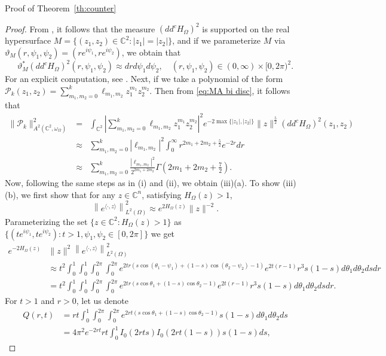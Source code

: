 \documentclass[11pt, oneside, reqno]{amsart}
\numberwithin{equation}{section}
\theoremstyle{definition}
\newcommand{\be} {\begin{equation}}
\newcommand{\ee} {\end{equation}}
\newcommand{\bea} {\begin{eqnarray}}
\newcommand{\eea} {\end{eqnarray}}
\newcommand{\C}{\mathbb C}
\newcommand{\ltt}{\left(}
\newcommand{\rtt}{\right)}
\newcommand{\Om}{\Omega}
\begin{document}
{\begin{section}{Proof of Theorem~\ref{th:counter}}
\begin{proof}
From \cite[Theorem 1]{BS08}, it follows that the measure $(dd^c H_\Om)^2$ is supported on the real hypersurface $M=\{(z_1,z_2)\in\C^2:|z_1|=|z_2|\}$, and if we parameterize $M$ via $\vartheta_M
         \ltt r,\psi_1,\psi_2\rtt=\ltt re^{i\psi_1},re^{i\psi_2}\rtt$, we obtain that
        \be\label{eq:MA bi disc}
       \vartheta_M^* (dd^cH_\Om)^2\ltt r,\psi_1,\psi_2\rtt\approx dr d\psi_1 d\psi_2,\quad (r,\psi_1,\psi_2)\in(0,\infty)\times[0,2\pi)^2.
        \ee
        For an explicit computation, see \cite[Section~6.2(iv)]{AC24}. 
Next, if we take a polynomial of the form $\mathcal P_k(z_1,z_2)=\sum\limits_{m_1,m_2=0}^k\ell_{m_1,m_2}z_1^{m_1} z_2^{m_2}$. Then from \eqref{eq:MA bi disc}, it follows that
 \bea\nonumber
       \|\mathcal P_k\|_{A^2(\C^2,\omega_\Om)}^2&=&\int_{\C^2}\left|{\sum\limits_{m_1,m_2=0}^k \ell_{m_1,m_2}} z_1^{m_1}z_2^{m_2}\right|^2 e^{-2\max\{|z_1|,|z_2|\}}\|z\|^{\frac{5}{2}}(dd^cH_\Om)^2(z_1,z_2)\\
       \nonumber
       &\approx&  \sum\limits_{m_1,m_2=0}^k |\ell_{m_1,m_2}|^2\int_0^\infty r^{2m_1+2m_2+\frac{5}{2}}e^{-2r} dr\\
      \nonumber &\approx& \sum\limits_{m_1,m_2=0}^k \frac{|\ell_{m_1,m_2}|^2}{2^{2m_1+2m_2}}\Gamma\ltt 2m_1+2m_2+\frac{7}{2}\rtt.
       \eea
Now, following the same steps as in (i) and (ii), we obtain (iii)(a).
{
To show (iii)(b), we first show that
for any $z\in\C^n$, satisfying $H_\Om(z)>1$,
\[
\left\|e^{\langle\cdot, z\rangle}\right\|^2_{L^2(\Om)}\approx {e^{2H_\Om(z)}}\|z\|^{-2}.
\]
Parameterizing the set $\{z\in\C^2: H_\Om(z)>1\}$ as $\{(te^{i\psi_1},te^{i\psi_2}): t>1, \psi_1,\psi_2\in[0,2\pi]\}$ we get
\begin{align}\label{eq:main est counter}
\nonumber e^{-2H_\Om(z)}&\|z\|^2\left\|e^{\langle\cdot, z\rangle}\right\|^2_{L^2(\Om)}\\ 
\nonumber&\approx t^2\int_0^1\int_0^1\int_0^{2\pi}\int_0^{2\pi} e^{2tr\ltt s\cos(\theta_1-\psi_1)+(1-s)\cos(\theta_2-\psi_2)-1\rtt} e^{2t(r-1)}r^3s(1-s) d\theta_1 d\theta_2 ds dr\\
&=t^2\int_0^1\int_0^1\int_0^{2\pi}\int_0^{2\pi} e^{2tr\ltt s\cos\theta_1+(1-s)\cos\theta_2-1\rtt} e^{2t(r-1)}r^3s(1-s) d\theta_1 d\theta_2 ds dr.
\end{align}
For $t>1$ and $r>0$, let us denote
\begin{align*}
Q(r,t)&=rt\int_0^1\int_0^{2\pi}\int_0^{2\pi} e^{2rt\ltt s\cos\theta_1+(1-s)\cos\theta_2-1\rtt} s(1-s) d\theta_1 d\theta_2 ds\\
&= 
4\pi^2 e^{-2rt}rt\int_0^1 I_0(2rts) I_0(2rt(1-s)) s(1-s) ds, 

\end{align*}}
\end{proof}
\end{section}}
\end{document}
